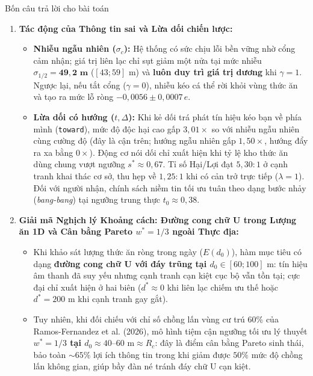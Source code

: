 \documentclass[11pt,a4paper]{report}
\begin{document}
\begin{ketqua}{Bốn câu trả lời cho bài toán}
\begin{enumerate}[leftmargin=1.5em,itemsep=3pt]
  \item \textbf{Tác động của Thông tin sai và Lừa dối chiến lược:}
  \begin{itemize}
    \item \textbf{Nhiễu ngẫu nhiên ($\sigma_c$):} Hệ thống có sức chịu lỗi bền vững nhờ cổng cảm nhận; giá trị liên lạc chỉ sụt giảm một nửa tại mức nhiễu $\sigma_{1/2} = \mathbf{49{,}2\text{ m}}$ ($[43; 59]\text{ m}$) và \textbf{luôn duy trì giá trị dương} khi $\gamma = 1$. Ngược lại, nếu tắt cổng ($\gamma = 0$), nhiễu kéo cá thể rời khỏi vùng thức ăn và tạo ra mức lỗ ròng $-0{,}0056 \pm 0{,}0007\,e$.
    \item \textbf{Lừa dối có hướng ($t, \Delta$):} Khi kẻ dối trá phát tín hiệu kéo bạn về phía mình (\texttt{toward}), mức độ độc hại cao gấp \textbf{$3{,}01\times$} so với nhiễu ngẫu nhiên cùng cường độ (đây là cận trên; hướng ngẫu nhiên gấp $1{,}50\times$, hướng đẩy ra xa bằng $0\times$). Động cơ nói dối chỉ xuất hiện khi tỷ lệ kho thức ăn dùng chung vượt ngưỡng $s^* \approx 0{,}67$. Tỉ số Hại/Lợi đạt $5{,}30 : 1$ ở cạnh tranh khai thác cơ sở, thu hẹp về $1{,}25 : 1$ khi có cản trở trực tiếp ($\lambda=1$). Đối với người nhận, chính sách niềm tin tối ưu tuân theo dạng bước nhảy (\textit{bang-bang}) tại ngưỡng trung thực $t_0 \approx 0{,}38$.
  \end{itemize}

  \item \textbf{Giải mã Nghịch lý Khoảng cách: Đường cong chữ U trong Lượng ăn 1D và Cân bằng Pareto $w^* = 1/3$ ngoài Thực địa:}
  \begin{itemize}
    \item Khi khảo sát lượng thức ăn ròng trong ngày ($E(d_0)$), hàm mục tiêu có dạng \textbf{đường cong chữ U với đáy trũng tại $d_0 \in [60; 100]\text{ m}$}: tín hiệu âm thanh đã suy yếu nhưng cạnh tranh cạn kiệt cục bộ vẫn tồn tại; cực đại chỉ xuất hiện ở hai biên ($d^* \approx 0$ khi liên lạc chiếm ưu thế hoặc $d^* = 200\text{ m}$ khi cạnh tranh gay gắt).
    \item Tuy nhiên, khi đối chiếu với chỉ số chồng lấn vùng cư trú 60\% của Ramos-Fernandez et al. (2026), mô hình tiệm cận ngưỡng tối ưu lý thuyết \textbf{$w^* = 1/3$ tại $d_0 \approx 40\text{--}60\text{ m} \approx R_c$}: đây là điểm cân bằng Pareto sinh thái, bảo toàn $\sim 65\%$ lợi ích thông tin trong khi giảm được $50\%$ mức độ chồng lấn không gian, giúp bầy đàn né tránh đáy chữ U cạn kiệt.
  \end{itemize}
\end{enumerate}
\end{ketqua}
\end{document}
